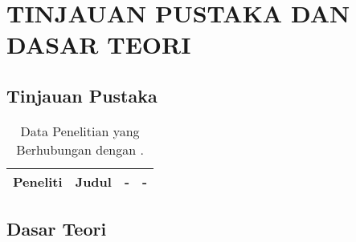 \chapter{TINJAUAN PUSTAKA DAN DASAR TEORI}
\section{Tinjauan Pustaka}
\begin{table}[htpb]
	\setlength\tabcolsep{3pt}
	\caption{Data Penelitian yang Berhubungan dengan .}
	\hspace*{-1.3cm}
	\begin{tabular}{| l | p{5.5cm} | p{4.5cm} |  p{2.5cm} |}
	\hline
	\rowcolor[HTML]{C0C0C0}
	\rowstyle{\color{black}}
	\bfseries Peneliti & \bfseries Judul &\bfseries -  & \bfseries -\\    \hline
	\end{tabular}
	\hspace*{-1cm}
	\label{tab:penelitian}
\end{table}

\section{Dasar Teori}

\lipsum[7]